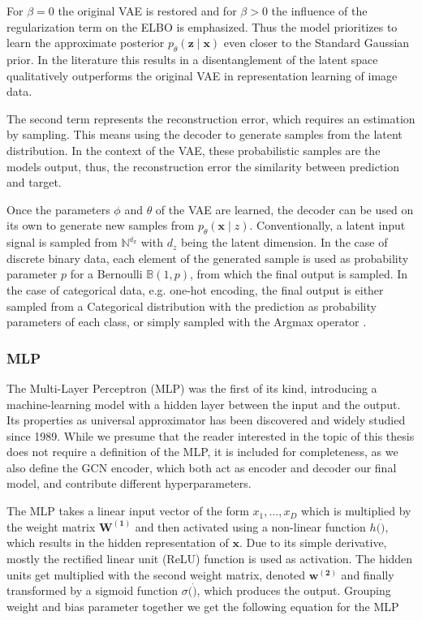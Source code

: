 For $\beta = 0$ the original VAE is restored and for $\beta>0$ the influence of the regularization term on the ELBO is emphasized. Thus the model prioritizes to learn the approximate posterior $p_{{\theta}}(\mathbf{z} \mid \mathbf{x})$ even closer to the Standard Gaussian prior. In the literature this results in a disentanglement of the latent space qualitatively outperforms the original VAE in representation learning of image data.

The second term represents the reconstruction error, which requires an estimation by sampling. This means using the decoder to generate samples from the latent distribution. In the context of the VAE, these probabilistic samples are the models output, thus, the reconstruction error the similarity between prediction and target\cite{kingma_auto-encoding_2014}.

Once the parameters $\phi$ and $\theta$ of the VAE are learned, the decoder can be used on its own to generate new samples from $p_{{\theta}}(\mathbf{x} \mid z)$. Conventionally, a latent input signal is sampled from $\mathbb{N^{d_z}}$ with $d_z$ being the latent dimension. In the case of discrete binary data, each element of the generated sample is used as probability parameter $p$ for a Bernoulli $\mathbb{B}(1,p)$, from which the final output is sampled. In the case of categorical data, e.g. one-hot encoding, the final output is either sampled from a Categorical distribution with the prediction as probability parameters of each class, or simply sampled with the Argmax operator \cite{kingma_introduction_2019}. 


\subsubsection{MLP}
\label{ssec:mlp}

The Multi-Layer Perceptron (MLP) was the first of its kind, introducing a machine-learning model with a hidden layer between the input and the output. 
Its properties as universal approximator has been discovered and widely studied since 1989.
While we presume that the reader interested in the topic of this thesis does not require a definition of the MLP, it is included for completeness, as we also define the GCN encoder, which both act as encoder and decoder our final model, and contribute different hyperparameters.

The MLP takes a linear input vector of the form $x_1,...,x_D$ which is multiplied by the weight matrix $\mathbf{W^{(1)}}$ and then activated using a non-linear function $h(\dot)$, which results in the hidden representation of $\mathbf{x}$. Due to its simple derivative, mostly the rectified linear unit (ReLU) function is used as activation. The hidden units get multiplied with the second weight matrix, denoted $\mathbf{w^{(2)}}$ and finally transformed by a sigmoid function $\sigma(\dot)$, which produces the output. Grouping weight and bias parameter together we get the following equation for the MLP

